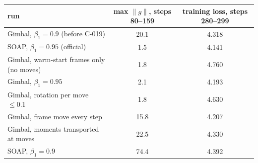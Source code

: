 \begin{tabular}{lcc}
\toprule
run & max $\|g\|$, steps 80--159 & training loss, steps 280--299 \\
\midrule
Gimbal, $\beta_1=0.9$ (before C-019) & 20.1 & 4.318 \\
SOAP, $\beta_1=0.95$ (official) & 1.5 & 4.141 \\
Gimbal, warm-start frames only (no moves) & 1.8 & 4.760 \\
Gimbal, $\beta_1=0.95$ & 2.1 & 4.193 \\
Gimbal, rotation per move $\le0.1$ & 1.8 & 4.630 \\
Gimbal, frame move every step & 15.8 & 4.207 \\
Gimbal, moments transported at moves & 22.5 & 4.330 \\
SOAP, $\beta_1=0.9$ & 74.4 & 4.392 \\
\bottomrule
\end{tabular}
